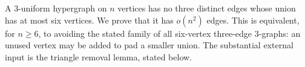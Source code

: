 A $3$-uniform hypergraph on $n$ vertices has no three distinct edges whose union has at most six vertices. We prove that it has $o(n^2)$ edges. This is equivalent, for $n\geq6$, to avoiding the stated family of all six-vertex three-edge $3$-graphs: an unused vertex may be added to pad a smaller union. The substantial external input is the triangle removal lemma, stated below.
